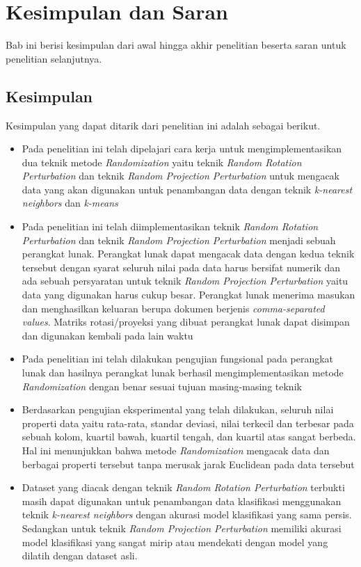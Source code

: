 \chapter{Kesimpulan dan Saran}
\label{chap:kesimpulan-saran}

Bab ini berisi kesimpulan dari awal hingga akhir penelitian beserta saran untuk penelitian selanjutnya.

\section{Kesimpulan}
\label{sec:kesimpulan}

Kesimpulan yang dapat ditarik dari penelitian ini adalah sebagai berikut.
\begin{itemize}
    \item Pada penelitian ini telah dipelajari cara kerja untuk mengimplementasikan dua teknik metode \textit{Randomization} yaitu teknik \textit{Random Rotation Perturbation} dan teknik \textit{Random Projection Perturbation} untuk mengacak data yang akan digunakan untuk penambangan data dengan teknik \textit{k-nearest neighbors} dan \textit{k-means}
    \item Pada penelitian ini telah diimplementasikan teknik \textit{Random Rotation Perturbation} dan teknik \textit{Random Projection Perturbation} menjadi sebuah perangkat lunak. Perangkat lunak dapat mengacak data dengan kedua teknik tersebut dengan syarat seluruh nilai pada data harus bersifat numerik dan ada sebuah persyaratan untuk teknik \textit{Random Projection Perturbation} yaitu data yang digunakan harus cukup besar. Perangkat lunak menerima masukan dan menghasilkan keluaran berupa dokumen berjenis \textit{comma-separated values}. Matriks rotasi/proyeksi yang dibuat perangkat lunak dapat disimpan dan digunakan kembali pada lain waktu
    \item Pada penelitian ini telah dilakukan pengujian fungsional pada perangkat lunak dan hasilnya perangkat lunak berhasil mengimplementasikan metode \textit{Randomization} dengan benar sesuai tujuan masing-masing teknik
    \item Berdasarkan pengujian eksperimental yang telah dilakukan, seluruh nilai properti data yaitu rata-rata, standar deviasi, nilai terkecil dan terbesar pada sebuah kolom, kuartil bawah, kuartil tengah, dan kuartil atas sangat berbeda. Hal ini menunjukkan bahwa metode \textit{Randomization} mengacak data dan berbagai properti tersebut tanpa merusak jarak Euclidean pada data tersebut
    \item Dataset yang diacak dengan teknik \textit{Random Rotation Perturbation} terbukti masih dapat digunakan untuk penambangan data klasifikasi menggunakan teknik \textit{k-nearest neighbors} dengan akurasi model klasifikasi yang sama persis. Sedangkan untuk teknik \textit{Random Projection Perturbation} memiliki akurasi model klasifikasi yang sangat mirip atau mendekati dengan model yang dilatih dengan dataset asli.

\end{itemize}
